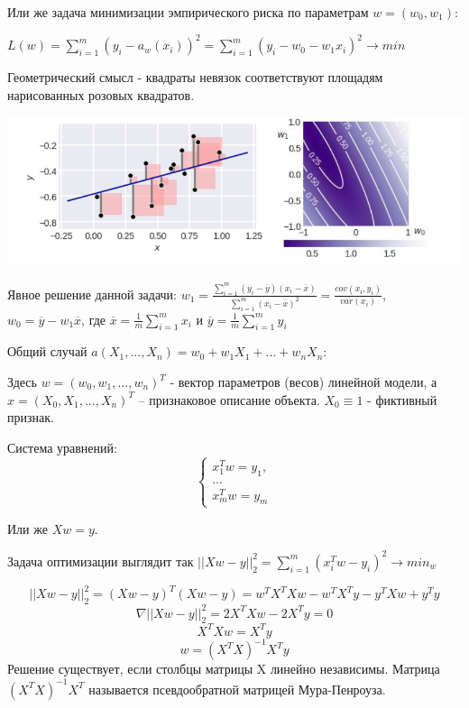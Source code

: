 Или же задача минимизации эмпирического риска по параметрам $w=(w_0, w_1)$:

$L(w) = \sum\limits_{i=1}^m (y_i - a_w(x_i))^2 = \sum\limits_{i=1}^m (y_i - w_0 - w_1x_i)^2 \rightarrow min$

Геометрический смысл - квадраты невязок соответствуют площадям нарисованных розовых
квадратов.

\includegraphics[scale=0.4]{pics/ml2_lin2.png}

Явное решение данной задачи:
$w_1 = \frac{\sum\limits_{i=1}^m (y_i - \overline y)(x_i - \overline x)}{\sum\limits_{i=1}^m (x_i - \overline x)^2} = \frac{cov(x_i, y_i)}{var(x_i)}$, $w_0 = \overline y - w_1 \overline x$, где $\overline x = \frac{1}{m} \sum\limits_{i=1}^m x_i$ и $\overline y = \frac{1}{m} \sum\limits_{i=1}^m y_i$

Общий случай $a(X_1, ..., X_n) = w_0 + w_1X_1 + ... + w_nX_n$:

Здесь $w = (w_0, w_1, ..., w_n)^T$ - вектор параметров (весов) линейной модели, а $x = (X_0, X_1, ..., X_n)^T$ – признаковое описание объекта. $X_0 \equiv 1$ - фиктивный признак.

Система уравнений:
\begin{equation*}
 \begin{cases}
   x_1^Tw = y_1,
   \\
   ...
   \\
   x_m^Tw = y_m
 \end{cases}
\end{equation*}

Или же $Xw = y$.

Задача оптимизации выглядит так $|| Xw - y ||_2^2 = \sum\limits_{i=1}^m (x_i^Tw - y_i)^2 \rightarrow min_w$

\begin{equation}
|| Xw - y ||_2^2 = (Xw - y)^T(Xw - y)= w^TX^TXw - w^TX^Ty - y^TXw +y^Ty
\end{equation}
\begin{equation}
\nabla || Xw - y ||_2^2 = 2X^TXw - 2X^Ty = 0
\end{equation}
\begin{equation}
 X^TXw = X^Ty
\end{equation}
\begin{equation}
 w = (X^TX)^{-1}X^Ty
\end{equation}
Решение существует, если столбцы матрицы X линейно независимы.
Матрица $(X^TX)^{-1}X^T$ называется псевдообратной матрицей Мура-Пенроуза.

